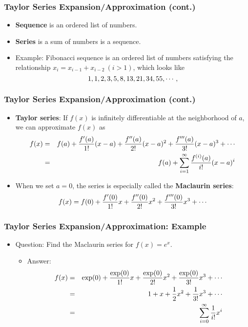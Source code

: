 \documentclass[pdflatex, 12pt]{beamer}
\begin{document}
\begin{frame}
\frametitle{Taylor Series Expansion/Approximation (cont.)}
\begin{itemize}
\item \textbf{Sequence} is an ordered list of numbers.
\vspace{0.4cm}
\item \textbf{Series} is a sum of numbers is a sequence.
\vspace{0.4cm}
\item Example: Fibonacci sequence is an ordered list of numbers satisfying the relationship $x_{i} = x_{i - 1} + x_{i - 2} \ (i > 1)$, which looks like
 \begin{equation}
 1, 1, 2, 3, 5, 8, 13, 21, 34, 55, \cdots, \notag
 \end{equation}
\end{itemize}
\end{frame}

\begin{frame}
\frametitle{Taylor Series Expansion/Approximation (cont.)}
\begin{itemize}
\item \textbf{Taylor series}: If $f(x)$ is infinitely differentiable at the neighborhood of $a$, we can approximate $f(x)$ as 
 {\footnotesize
 \begin{eqnarray}
 f(x) &=& f(a) + \frac{f'(a)}{1!}(x - a) + \frac{f''(a)}{2!}(x - a)^2 + \frac{f'''(a)}{3!}(x - a)^3 + \cdots \notag \\
 &=& f(a) + \sum_{i = 1}^{\infty} \frac{f^{(i)} (a)}{i!}(x - a)^i \notag
 \end{eqnarray}
 }
\vspace{0.2cm}
\item When we set $a = 0$, the series is especially called the \textbf{Maclaurin series}:
 {\footnotesize
 \begin{equation}
 f(x) = f(0) + \frac{f'(0)}{1!}x + \frac{f''(0)}{2!}x^2 + \frac{f'''(0)}{3!}x^3 + \cdots \notag
 \end{equation}
 }
\end{itemize}
\end{frame}

\begin{frame}
\frametitle{Taylor Series Expansion/Approximation: Example}
\begin{itemize}
\item Question: Find the Maclaurin series for $f(x) = e^x$.
\vspace{0.4cm}
 \begin{itemize}
 \item Answer:
  {\footnotesize
  \begin{eqnarray}
  f(x) &=& \exp(0) + \frac{\exp(0)}{1!}x + \frac{\exp(0)}{2!}x^2 + \frac{\exp(0)}{3!}x^3 + \cdots \notag \\
  &=& 1 + x + \frac{1}{2}x^2 + \frac{1}{3!}x^3 + \cdots \notag \\
  &=& \sum_{i = 0}^{\infty} \frac{1}{i!}x^i \notag
  \end{eqnarray}
  }
 \end{itemize}
\end{itemize}
\end{frame}
\end{document}
